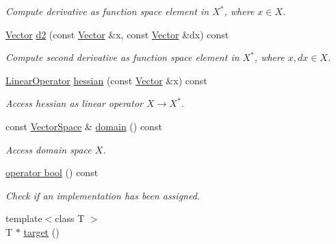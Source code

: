 \begin{DoxyCompactItemize}
\begin{DoxyCompactList}\small\item\em Compute derivative as function space element in $X^*$, where $x\in X$. \end{DoxyCompactList}\item 
\hypertarget{classSpacy_1_1C2Functional_af2f8671e8ebb9079255afc39a495859d}{}\hyperlink{classSpacy_1_1Vector}{Vector} \hyperlink{classSpacy_1_1C2Functional_af2f8671e8ebb9079255afc39a495859d}{d2} (const \hyperlink{classSpacy_1_1Vector}{Vector} \&x, const \hyperlink{classSpacy_1_1Vector}{Vector} \&dx) const \label{classSpacy_1_1C2Functional_af2f8671e8ebb9079255afc39a495859d}

\begin{DoxyCompactList}\small\item\em Compute second derivative as function space element in $X^*$, where $x,dx\in X$. \end{DoxyCompactList}\item 
\hypertarget{classSpacy_1_1C2Functional_a97eeeb376ed178ea7e2f109967f99c24}{}\hyperlink{classSpacy_1_1LinearOperator}{Linear\+Operator} \hyperlink{classSpacy_1_1C2Functional_a97eeeb376ed178ea7e2f109967f99c24}{hessian} (const \hyperlink{classSpacy_1_1Vector}{Vector} \&x) const \label{classSpacy_1_1C2Functional_a97eeeb376ed178ea7e2f109967f99c24}

\begin{DoxyCompactList}\small\item\em Access hessian as linear operator $ X \rightarrow X^* $. \end{DoxyCompactList}\item 
\hypertarget{classSpacy_1_1C2Functional_ac75246c876b8bf75cdd4f1264bdb49ae}{}const \hyperlink{classSpacy_1_1VectorSpace}{Vector\+Space} \& \hyperlink{classSpacy_1_1C2Functional_ac75246c876b8bf75cdd4f1264bdb49ae}{domain} () const \label{classSpacy_1_1C2Functional_ac75246c876b8bf75cdd4f1264bdb49ae}

\begin{DoxyCompactList}\small\item\em Access domain space $X$. \end{DoxyCompactList}\item 
\hypertarget{classSpacy_1_1C2Functional_a125ddf654fbe1ebca2710355e751f466}{}\hyperlink{classSpacy_1_1C2Functional_a125ddf654fbe1ebca2710355e751f466}{operator bool} () const \label{classSpacy_1_1C2Functional_a125ddf654fbe1ebca2710355e751f466}

\begin{DoxyCompactList}\small\item\em Check if an implementation has been assigned. \end{DoxyCompactList}\item 
\hypertarget{structSpacy_1_1Mixin_1_1ToTarget_a3510786172c63a074eda127276d13392}{}{\footnotesize template$<$class T $>$ }\\T $\ast$ \hyperlink{structSpacy_1_1Mixin_1_1ToTarget_a3510786172c63a074eda127276d13392}{target} ()\label{structSpacy_1_1Mixin_1_1ToTarget_a3510786172c63a074eda127276d13392}


\end{DoxyCompactItemize}
